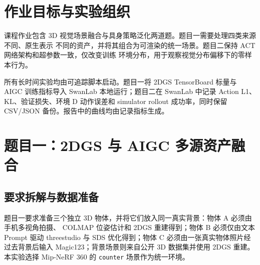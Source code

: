 \documentclass[10pt,a4paper,UTF8,fontset=windows]{ctexart}
\newcommand{\code}[1]{\texttt{\small #1}}
\begin{document}
\twocolumn

\begin{abstract}
本作业包含两个相互独立但都强调完整实验链路的视觉任务。题目一从真实采集、文本生成和
单图生成三种来源构建 3D 资产，使用 2D Gaussian Splatting（2DGS）重建真实物体与
Mip-NeRF 360 背景，并将异构表示统一为 Mesh 后在 Blender 中完成融合渲染。题目二使用
LeRobot 中的 ACT 策略，在 CALVIN 环境 B 与混合环境 A+B+C 上分别训练模型，再在未见过的
环境 D 上比较离线零样本动作误差，并补充 CALVIN simulator rollout 成功率。实验表明：
多视角重建在几何可靠性上最强，文本到 3D 输入成本
最低，单图到 3D 则在真实外观保持与采集成本之间折中；ACT 的多环境训练具有略高的序列验证损失，
并使环境 D 的 first-action MAE 和 chunk-action MAE 分别下降 22.0\% 和 17.2\%。
两个策略在 3 条环境 D simulator 五任务序列上的 SR@1--SR@5 均为 0，说明离线动作误差与
长时闭环成功率反映的是不同层次的泛化能力。
\end{abstract}

\section{作业目标与实验组织}

课程作业包含 3D 视觉场景融合与具身策略泛化两道题。题目一需要处理四类来源不同、原生表示
不同的资产，并将其组合为可渲染的统一场景。题目二保持 ACT 网络架构和超参数一致，仅改变训练
环境分布，用于观察视觉分布偏移下的零样本行为。

所有长时间实验均由可追踪脚本启动。题目一将 2DGS TensorBoard 标量与 AIGC 训练指标导入
SwanLab 本地运行；题目二在 SwanLab 中记录 Action L1、KL、验证损失、环境 D 动作误差和
simulator rollout 成功率，同时保留 CSV/JSON 备份。报告中的曲线均由记录指标生成。

\section{题目一：2DGS 与 AIGC 多源资产融合}

\subsection{要求拆解与数据准备}

题目一要求准备三个独立 3D 物体，并将它们放入同一真实背景：物体 A 必须由手机多视角拍摄、
COLMAP 位姿估计和 2DGS 重建得到；物体 B 必须仅由文本 Prompt 驱动 threestudio 与 SDS
优化得到；物体 C 必须由一张真实物体照片经过去背景后输入 Magic123；背景场景则来自公开 3D
数据集并使用 2DGS 重建。本实验选择 Mip-NeRF 360 的 \code{counter} 场景作为统一环境。
\end{document}
